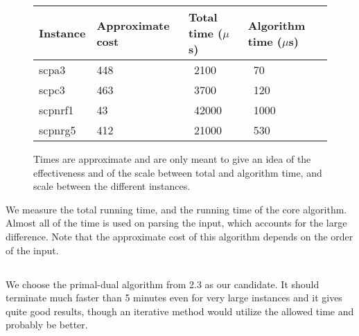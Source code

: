 \documentclass[11pt]{article}
\begin{document}
\begin{figure}[H]
    \centering
    \begin{tabular}{llll}
        \toprule
        Instance & Approximate cost &
		Total time ($\mu$s) & Algorithm time ($\mu$s) \\
        \midrule
        scpa3       & 448     & ~2100     & ~70    \\
        scpc3       & 463     & ~3700     & ~120   \\
        scpnrf1     & 43      & ~42000    & ~1000  \\
        scpnrg5     & 412     & ~21000    & ~530   \\
        \bottomrule
    \end{tabular}
    \caption{Times are approximate and are only meant to give an idea of the
	effectiveness and of the scale between total and algorithm time, and scale
	between the different instances.}\label{fig:c-results}
\end{figure}

We measure the total running time, and the running time of the core algorithm.
Almost all of the time is used on
parsing the input, which accounts for the large difference. Note that the
approximate cost of this algorithm depends on the order of the input.

\subsection{}
We choose the primal-dual algorithm from 2.3 as our candidate. It should
terminate much faster than 5 minutes even for very large instances and it gives
quite good results, though an iterative method would utilize the allowed time
and probably be better.
\end{document}
